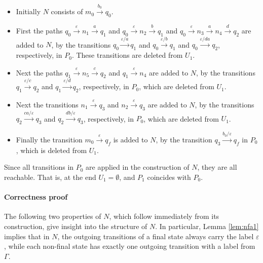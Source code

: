 \documentclass{llncs}
\newcommand{\eps}{\ensuremath{\varepsilon}}
\begin{document}
\begin{example}
\begin{itemize}
\item
Initially $N$ consists of $m_0\stackrel{b_0}{\rightarrow}q_0$.\vspace{1mm}
\item
First the paths $q_0\stackrel{\eps}{\rightarrow}n_1\stackrel{a}{\rightarrow}q_1$ and $q_0\stackrel{\eps}{\rightarrow}n_2\stackrel{b}{\rightarrow}q_1$
and $q_0\stackrel{\eps}{\rightarrow}n_3\stackrel{a}{\rightarrow}n_4\stackrel{d}{\rightarrow}q_2$ are added to $N$, by the transitions
$q_0\stackrel{\eps/a}{\rightarrow}q_1$ and $q_0\stackrel{\eps/b}{\rightarrow}q_1$ and $q_0\stackrel{\eps/da}{\rightarrow}q_2$, respectively, in $P_0$.
These transitions are deleted from $U_1$.\vspace{1mm}
\item
Next the paths $q_1\stackrel{\eps}{\rightarrow}n_5\stackrel{c}{\rightarrow}q_2$ and $q_1\stackrel{\eps}{\rightarrow}n_4$ are added
to $N$, by the transitions $q_1\stackrel{\eps/c}{\rightarrow}q_2$ and $q_1\stackrel{\eps/d}{\rightarrow}q_2$, respectively, in $P_0$,
which are deleted from $U_1$.\vspace{1mm}
\item
Next the transitions $n_1\stackrel{\eps}{\rightarrow}q_3$ and $n_2\stackrel{\eps}{\rightarrow}q_3$ are added to $N$,
by the transitions $q_2\!\stackrel{ca/\eps}{\rightarrow}\!q_3$ and $q_2\!\stackrel{db/\eps}{\rightarrow}\!q_3$, respectively, in $P_0$,
which are deleted from $U_1$.\vspace{1mm}
\item
Finally the transition $m_0\stackrel{\eps}{\rightarrow}q_f$ is added to $N$,
by the transition $q_3\stackrel{b_0/\eps}{\rightarrow}q_f$ in $P_0$,
which is deleted from $U_1$.
\end{itemize}
Since all transitions in $P_0$ are applied in the construction of $N$, they are all reachable. That is, at the end $U_1=\emptyset$,
and $P_1$ coincides with $P_0$.
\end{example}

\paragraph{Correctness proof}
The following two properties of $N$, which follow immediately from its construction, give insight into the structure of $N$.
In particular, Lemma \ref{lem:nfa1} implies that in $N$, the outgoing transitions of a final state always carry the label $\eps$,
while each non-final state has exactly one outgoing transition with a label from $\Gamma$.
\end{document}
